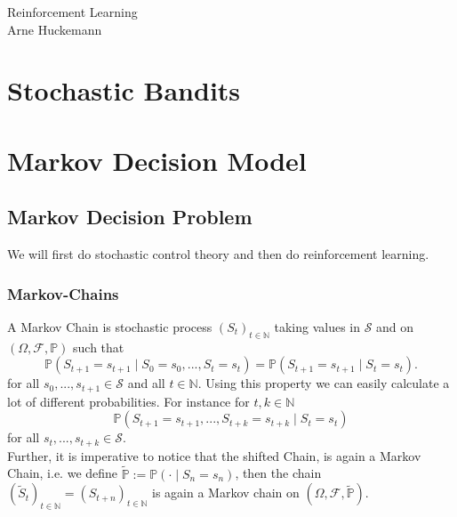 \documentclass[A4,12pt,twoside]{book}
\begin{document}
\begin{center}
   \huge{Reinforcement Learning}\\
    Arne Huckemann
\end{center}
\tableofcontents


\chapter{Stochastic Bandits}




\chapter{Markov Decision Model}
\section{Markov Decision Problem}
We will first do stochastic control theory and then do reinforcement learning.
\subsection{Markov-Chains}
A Markov Chain is stochastic process $(S_t)_{t \in \mathbb{N}}$ taking values in $\mathcal{S}$ and on $(\Omega, \mathcal{F},\mathbb{P})$ such that
$$
\mathbb{P}(S_{t+1} = s_{t+1} \mid S_0 =s_0 ,...,S_t = s_t) = \mathbb{P}(S_{t+1} = s_{t+1} \mid S_t = s_t).
$$
for all $s_0,...,s_{t+1} \in \mathcal{S}$ and all $t \in \mathbb{N}$.
Using this property we can easily calculate a lot of different probabilities. For instance for $t,k \in \mathbb{N}$
$$
\mathbb{P} (S_{t+1}=s_{t+1},...,S_{t+k}=s_{t+k} \mid S_t = s_t)
$$
for all $s_t ,..., s_{t+k} \in \mathcal{S}$.\\
Further, it is imperative to notice that the shifted Chain, is again a Markov Chain, i.e. we define $\tilde{\mathbb{P}} := \mathbb{P}( \cdot \mid S_n =s_n)$, then the chain $(\tilde{S}_t)_{t \in \mathbb{N}} = (S_{t+n})_{t \in \mathbb{N}}$ is again a Markov chain on $(\Omega, \mathcal{F}, \tilde{\mathbb{P}})$.
\end{document}
